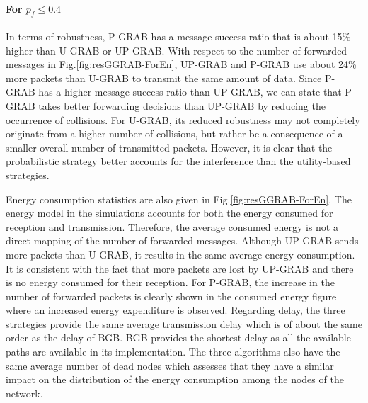 \documentclass[journal, peerreview, onecolumn, draftcls]{IEEEtran}
\begin{document}
\paragraph{\rm For $p_f\leq0.4$}
In terms of robustness, P-GRAB has a message success ratio that is about 15\% higher than U-GRAB or UP-GRAB.
With respect to the number of forwarded messages in Fig.\ref{fig:resGGRAB-ForEn}, UP-GRAB and P-GRAB use about 24\% more packets than U-GRAB to transmit the same amount of data. Since P-GRAB has a higher message success ratio than UP-GRAB, we can state that P-GRAB takes better forwarding decisions than UP-GRAB by reducing the occurrence of collisions. For U-GRAB, its reduced robustness may not completely originate from a higher number of collisions, but rather be a consequence of a smaller overall number of transmitted packets. However, it is clear that the probabilistic strategy better accounts for the interference than the utility-based strategies.

Energy consumption statistics are also given in Fig.\ref{fig:resGGRAB-ForEn}. The energy model in the simulations accounts for both the energy consumed for reception and transmission. Therefore, the average consumed energy is not a direct mapping of the number of forwarded messages. Although UP-GRAB sends more packets than U-GRAB, it results in the same average energy consumption. It is consistent with the fact that more packets are lost by UP-GRAB and there is no energy consumed for their reception. For P-GRAB, the increase in the number of forwarded packets is clearly shown in the consumed energy figure where an increased energy expenditure is observed.
Regarding delay, the three strategies provide the same average transmission delay which is of about the same order as the delay of BGB. BGB provides the shortest delay as all the available paths are available in its implementation.
The three algorithms also have the same average number of dead nodes which assesses that they have a similar impact on the distribution of the energy consumption among the nodes of the network.
\end{document}
